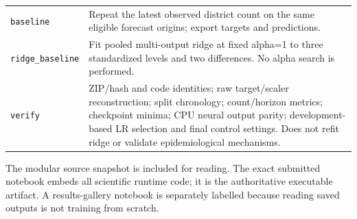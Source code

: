 \documentclass[11pt]{article}
\begin{document}
\begin{longtable}{p{}p{}}
\texttt{baseline} & Repeat the latest observed district count on the same eligible forecast origins; export targets and predictions.\\
\texttt{ridge\_baseline} & Fit pooled multi-output ridge at fixed alpha=1 to three standardized levels and two differences. No alpha search is performed.\\
\texttt{verify} & ZIP/hash and code identities; raw target/scaler reconstruction; split chronology; count/horizon metrics; checkpoint minima; CPU neural output parity; development-based LR selection and final control settings. Does not refit ridge or validate epidemiological mechanisms.\\\bottomrule
\end{longtable}

The modular source snapshot is included for reading. The exact submitted notebook embeds all scientific runtime code; it is the authoritative executable artifact. A results-gallery notebook is separately labelled because reading saved outputs is not training from scratch.
\end{document}
